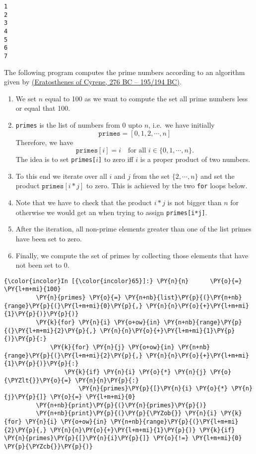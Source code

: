 \begin{Verbatim}[commandchars=\\\{\}]
1
2
3
4
5
6
7
\end{Verbatim}
The following program computes the prime numbers according to an
algorithm given by  \href{https://en.wikipedia.org/wiki/Eratosthenes}{(Eratosthenes of Cyrene, 276 BC -- 195/194 BC)}.

\begin{enumerate}
\item We set $n$ equal to 100 as we want to compute the set all prime numbers less or equal that 100.
\item \texttt{primes} is the list of numbers from 0 upto $n$, i.e.~we have initially
      $$ \texttt{primes} = [0,1,2,\cdots,n] $$
      Therefore, we have
      $$ \texttt{primes}[i] = i \quad \mbox{for all $i \in \{0,1,\cdots,n\}$.} $$
      The idea is to set \texttt{primes[$i$]} to zero iff $i$ is a proper product of two numbers.

\item To this end we iterate over all $i$ and $j$ from the set $\{2,\cdots,n\}$
  and set the product $\texttt{primes}[i*j]$ to zero.  This is achieved by the two \texttt{for} loops below.
\item Note that we have to check that the product $i * j$ is not bigger than $n$ for otherwise we would get an
    when trying to assign \texttt{primes[i*j]}.
\item After the iteration, all non-prime elements greater than one of the list primes have been set to zero.
\item Finally, we compute the set of primes by collecting those elements that have not been set to $0$.
\end{enumerate}

\begin{Verbatim}[commandchars=\\\{\}]
{\color{incolor}In [{\color{incolor}65}]:} \PY{n}{n}      \PY{o}{=} \PY{l+m+mi}{100}
         \PY{n}{primes} \PY{o}{=} \PY{n+nb}{list}\PY{p}{(}\PY{n+nb}{range}\PY{p}{(}\PY{l+m+mi}{0}\PY{p}{,} \PY{n}{n}\PY{o}{+}\PY{l+m+mi}{1}\PY{p}{)}\PY{p}{)}
         \PY{k}{for} \PY{n}{i} \PY{o+ow}{in} \PY{n+nb}{range}\PY{p}{(}\PY{l+m+mi}{2}\PY{p}{,} \PY{n}{n}\PY{o}{+}\PY{l+m+mi}{1}\PY{p}{)}\PY{p}{:}
             \PY{k}{for} \PY{n}{j} \PY{o+ow}{in} \PY{n+nb}{range}\PY{p}{(}\PY{l+m+mi}{2}\PY{p}{,} \PY{n}{n}\PY{o}{+}\PY{l+m+mi}{1}\PY{p}{)}\PY{p}{:}
                 \PY{k}{if} \PY{n}{i} \PY{o}{*} \PY{n}{j} \PY{o}{\PYZlt{}}\PY{o}{=} \PY{n}{n}\PY{p}{:}
                     \PY{n}{primes}\PY{p}{[}\PY{n}{i} \PY{o}{*} \PY{n}{j}\PY{p}{]} \PY{o}{=} \PY{l+m+mi}{0}
         \PY{n+nb}{print}\PY{p}{(}\PY{n}{primes}\PY{p}{)}
         \PY{n+nb}{print}\PY{p}{(}\PY{p}{\PYZob{}} \PY{n}{i} \PY{k}{for} \PY{n}{i} \PY{o+ow}{in} \PY{n+nb}{range}\PY{p}{(}\PY{l+m+mi}{2}\PY{p}{,} \PY{n}{n}\PY{o}{+}\PY{l+m+mi}{1}\PY{p}{)} \PY{k}{if} \PY{n}{primes}\PY{p}{[}\PY{n}{i}\PY{p}{]} \PY{o}{!=} \PY{l+m+mi}{0} \PY{p}{\PYZcb{}}\PY{p}{)}
\end{Verbatim}

